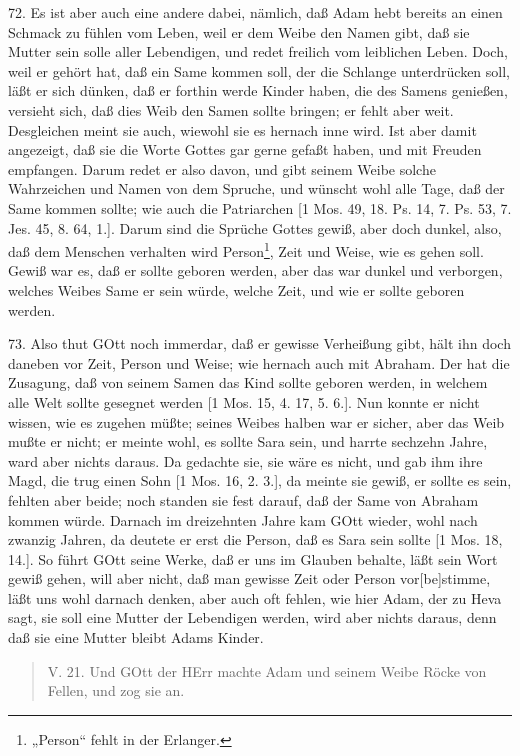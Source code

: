 72. Es ist aber auch eine andere dabei, nämlich, daß Adam hebt bereits an einen Schmack zu fühlen vom Leben, weil er dem Weibe den Namen gibt, daß sie Mutter sein solle aller Lebendigen, und redet freilich vom leiblichen Leben. Doch, weil er gehört hat, daß ein Same kommen soll, der die Schlange unterdrücken soll, läßt er sich dünken, daß er forthin werde Kinder haben, die des Samens genießen, versieht sich, daß dies Weib den Samen sollte bringen; er fehlt aber weit. Desgleichen meint sie auch, wiewohl sie es hernach inne wird. Ist aber damit angezeigt, daß sie die Worte Gottes gar gerne gefaßt haben, und mit Freuden empfangen. Darum redet er also davon, und gibt seinem Weibe solche Wahrzeichen und Namen von dem Spruche, und wünscht wohl alle Tage, daß der Same kommen sollte; wie auch die Patriarchen [1 Mos. 49, 18. Ps. 14, 7. Ps. 53, 7. Jes. 45, 8. 64, 1.]. Darum sind die Sprüche Gottes gewiß, aber doch dunkel, also, daß dem Menschen verhalten wird Person\footnote{„Person“ fehlt in der Erlanger.}, Zeit und Weise, wie es gehen soll. Gewiß war es, daß er sollte geboren werden, aber das war dunkel und verborgen, welches Weibes Same er sein würde, welche Zeit, und wie er sollte geboren werden.

73. Also thut GOtt noch immerdar, daß er gewisse Verheißung gibt, hält ihn doch daneben vor Zeit, Person und Weise; wie hernach auch mit Abraham. Der hat die Zusagung, daß von seinem Samen das Kind sollte geboren werden, in welchem alle Welt sollte gesegnet werden [1 Mos. 15, 4. 17, 5. 6.]. Nun konnte er nicht wissen, wie es zugehen müßte; seines Weibes halben war er sicher, aber das Weib mußte er nicht; er meinte wohl, es sollte Sara sein, und harrte sechzehn Jahre, ward aber nichts daraus. Da gedachte sie, sie wäre es nicht, und gab ihm ihre Magd, die trug einen Sohn [1 Mos. 16, 2. 3.], da meinte sie gewiß, er sollte es sein, fehlten aber beide; noch standen sie fest darauf, daß der Same von Abraham kommen würde. Darnach im dreizehnten Jahre kam GOtt wieder, wohl nach zwanzig Jahren, da deutete er erst die Person, daß es Sara sein sollte [1 Mos. 18, 14.]. So führt GOtt seine Werke, daß er uns im Glauben behalte, läßt sein Wort gewiß gehen, will aber nicht, daß man gewisse Zeit oder Person vor[be]stimme, läßt uns wohl darnach denken, aber auch oft fehlen, wie hier Adam, der zu Heva sagt, sie soll eine Mutter der Lebendigen werden, wird aber nichts daraus, denn daß sie eine Mutter bleibt Adams Kinder.

\begin{quote}
V. 21. Und GOtt der HErr machte Adam und seinem Weibe Röcke von Fellen, und zog sie an.
\end{quote}

